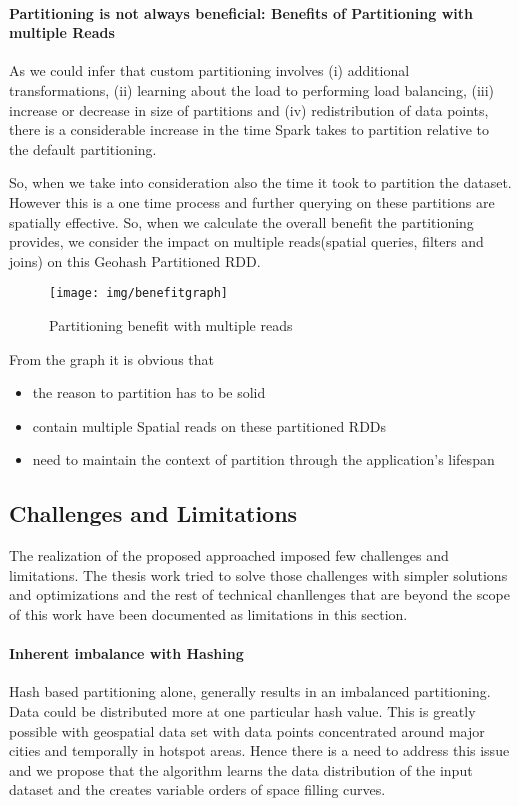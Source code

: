 \documentclass[article,type=msc,colorback,12pt,accentcolor=tud1d]{tudthesis}
\begin{document}
			\paragraph{Partitioning is not always beneficial: Benefits of Partitioning with multiple Reads}
			
			As we could infer that custom partitioning involves (i) additional transformations, (ii) learning about the load to performing load balancing, (iii) increase or decrease in size of partitions and  (iv) redistribution of data points, there is a considerable increase in the time Spark takes to partition relative to the default partitioning. 
			
			So, when we take into consideration also the time it took to partition the dataset. However this is a one time process and further querying on these partitions are spatially effective. So, when we calculate the overall benefit the partitioning provides, we consider the impact on multiple reads(spatial queries, filters and joins) on this Geohash Partitioned RDD. 
							 
				\begin{figure}[h]
				\centering
				\texttt{[image: img/benefitgraph]}
				\caption{Partitioning benefit with multiple reads}
				\label{fig:benefitgraph}
				\end{figure}
			
			From the graph it is obvious that 
			\begin{itemize}
				\item the reason to partition has to be solid 
				\item contain multiple Spatial reads on these partitioned RDDs
				\item need to maintain the context of partition through the application’s lifespan
			\end{itemize}
						  
		  \clearpage
		  \subsection{Challenges and Limitations}
		  
		  The realization of the proposed approached imposed few challenges and limitations. The thesis work tried to solve those challenges with simpler solutions and optimizations and the rest of technical chanllenges that are beyond the scope of this work have been documented as limitations in this section.
		  
		  \paragraph{Inherent imbalance with Hashing}
			  Hash based partitioning alone, generally results in an imbalanced partitioning. Data could be distributed more at one particular hash value. This is greatly possible with geospatial data set with data points concentrated around major cities and temporally in hotspot areas. Hence there is a need to address this issue and we propose that the algorithm learns the data distribution of the input dataset and the creates variable orders of space filling curves. 
			  
\end{document}

